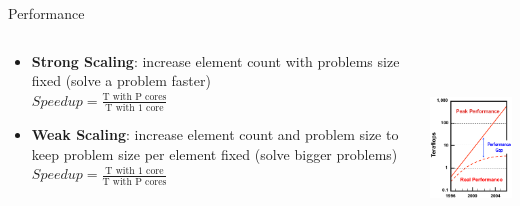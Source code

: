 \documentclass[xcolor=x11names,compress]{beamer}
\renewcommand{\(}{\begin{columns}}
\renewcommand{\)}{\end{columns}}
\newcommand{\<}[1]{\begin{column}{#1}}
\renewcommand{\>}{\end{column}}
\begin{document}
\begin{frame}{Performance}

\begin{columns}
  \begin{column}{0.65\textwidth}
\begin{itemize}
\item \textbf{Strong Scaling}: increase element count with problems size fixed (solve a problem faster)\\
\vspace*{0.5 em}
$Speedup = \frac{\text{T with P cores}}{\text{T with 1 core}}$
\item \textbf{Weak Scaling}: increase element count and problem size to keep problem size per element fixed (solve bigger problems)\\
\vspace*{0.5 em}
$Speedup = \frac{\text{T with 1 core}}{\text{T with P cores}}$
\end{itemize}
  \end{column}
  \begin{column}{0.35\textwidth}
    \includegraphics[height=2in,clip]{PerformanceGap}
  \end{column}
\end{columns}

\end{frame}
\end{document}
